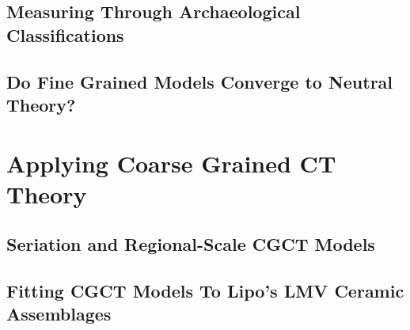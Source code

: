 \subsection{Measuring \CT Through Archaeological Classifications}
\label{sec:rq-cg-classification}


\subsection{Do Fine Grained \CT Models Converge to Neutral Theory?}
\label{sec:rq-cg-convergence}




\section{Applying Coarse Grained CT Theory}
\label{sec:rq-applications}



\subsection{Seriation and Regional-Scale CGCT Models}
\label{sec:rq-appl-seriation-behavior}



\subsection{Fitting CGCT Models To Lipo's LMV Ceramic Assemblages}
\label{sec:req-appl-lipo-lmv}









